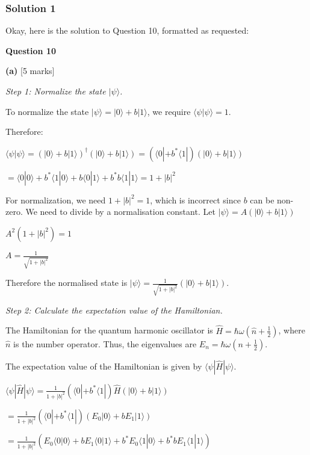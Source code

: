 \documentclass{article}
\begin{document}
\subsubsection{Solution 1}
Okay, here is the solution to Question 10, formatted as requested:

\noindent\textbf{Question 10}

\textbf{(a)} [5 marks]

\noindent\textit{Step 1: Normalize the state $|\psi\rangle$.}

\noindent To normalize the state $|\psi\rangle = |0\rangle + b|1\rangle$, we require $\langle \psi | \psi \rangle = 1$.

\noindent Therefore:

\noindent $\langle \psi | \psi \rangle = (|0\rangle + b|1\rangle)^\dagger (|0\rangle + b|1\rangle) = (\langle 0| + b^*\langle 1|) (|0\rangle + b|1\rangle)$

\noindent $= \langle 0|0 \rangle + b^*\langle 1|0\rangle + b\langle 0|1\rangle + b^*b\langle 1|1\rangle = 1 + |b|^2$

\noindent For normalization, we need $1 + |b|^2 = 1$, which is incorrect since $b$ can be non-zero. We need to divide by a normalisation constant. Let $|\psi\rangle = A(|0\rangle + b|1\rangle)$

\noindent $A^2 (1 + |b|^2) = 1$

\noindent $A = \frac{1}{\sqrt{1 + |b|^2}}$

\noindent Therefore the normalised state is $|\psi\rangle = \frac{1}{\sqrt{1+|b|^2}}(|0\rangle + b|1\rangle)$.

\noindent\textit{Step 2: Calculate the expectation value of the Hamiltonian.}

\noindent The Hamiltonian for the quantum harmonic oscillator is $\hat{H} = \hbar\omega(\hat{n} + \frac{1}{2})$, where $\hat{n}$ is the number operator. Thus, the eigenvalues are $E_n = \hbar\omega(n+\frac{1}{2})$.

\noindent The expectation value of the Hamiltonian is given by $\langle \psi | \hat{H} | \psi \rangle$.

\noindent $\langle \psi | \hat{H} | \psi \rangle = \frac{1}{1+|b|^2} (\langle 0| + b^*\langle 1|) \hat{H} (|0\rangle + b|1\rangle)$

\noindent $= \frac{1}{1+|b|^2} (\langle 0| + b^*\langle 1|) (E_0|0\rangle + bE_1|1\rangle)$

\noindent $= \frac{1}{1+|b|^2} (E_0\langle 0|0\rangle + bE_1\langle 0|1\rangle + b^*E_0\langle 1|0\rangle + b^*bE_1\langle 1|1\rangle)$
\end{document}
